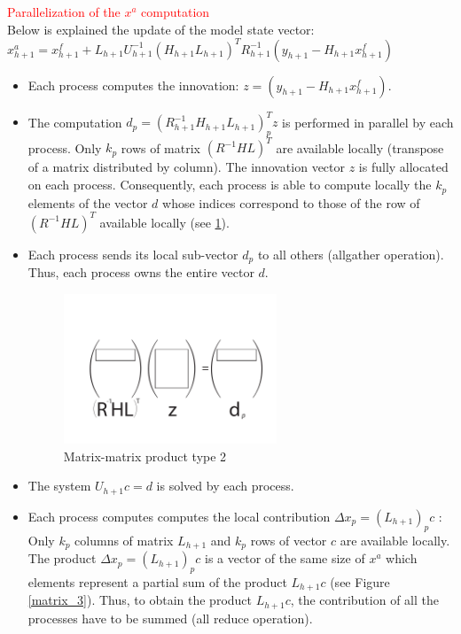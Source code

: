 \par \textcolor{red}{Parallelization of the $x^a$ computation}\\

Below is explained the update of the model state vector:\\
$ x_{h+1}^a = x_{h+1}^f + L_{h+1}U_{h+1}^{-1}(H_{h+1}L_{h+1})^T R_{h+1}^{-1} (y_{h+1}-H_{h+1}x_{h+1}^f)$\\


 \begin{itemize}
  \item Each process computes the innovation: $z = (y_{h+1}-H_{h+1}x_{h+1}^f)$.

  \item  The computation $d_p = (R_{h+1}^{-1}H_{h+1}L_{h+1})_p^Tz$  is performed in parallel by each process. Only $k_p$ rows of matrix  $(R^{-1}HL)^T$  are available locally (transpose of a matrix distributed by column). The innovation vector $z$ is fully allocated on each process. Consequently, each process is able to compute locally the $k_p$ elements of the vector $d$ whose indices correspond to those of the row of $(R^{-1}HL)^T$ available locally  (see \ref{matrix_2}).

  \item Each process sends its local sub-vector  $d_p$ to all others (allgather operation). Thus, each process owns the entire vector  $d$.\\

    \begin{figure}[htpb]
        \includegraphics[width=0.6\textwidth]{figure/p93.pdf}
        \caption{Matrix-matrix product type 2}
        \label{matrix_2}
      \end{figure}

 \item The system  $U_{h+1}c = d$ is solved by each process.

  \item Each process computes computes the local contribution $\Delta x_p = (L_{h+1})_p c$ :\\
  Only $k_p$ columns of matrix $L_{h+1}$ and $k_p$ rows of vector $c$ are available locally. The product $\Delta x_p = (L_{h+1})_p c$ is a vector of the same size of $x^a$ which elements represent a partial sum of the product $L_{h+1} c$ (see Figure \ref{matrix_3}). Thus, to obtain the product  $L_{h+1} c$, the contribution of all the processes have to be summed (all reduce operation).


\end{itemize}
